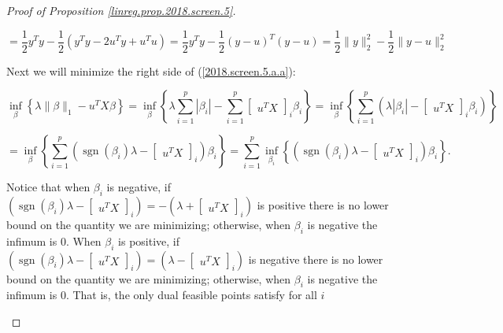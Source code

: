 \begin{proof}[Proof of Proposition \ref{linreg.prop.2018.screen.5}]
\begin{enumerate}[(a)]
\[
= \frac{1}{2} y^Ty - \frac{1}{2}(y^Ty - 2u^Ty + u^Tu ) = \frac{1}{2} y^Ty - \frac{1}{2}(y - u)^T(y - u)= \frac{1}{2} \lVert y \rVert_2^2 - \frac{1}{2} \lVert y - u \rVert_2^2 
\]

Next we will minimize the right side of (\ref{2018.screen.5.a.a}):

\[
 \inf_{\beta} \left\{ \lambda \lVert \beta \rVert_1  - u^T X \beta  \right\} =  \inf_{\beta} \left\{ \lambda \sum_{i=1}^p | \beta_i| - \sum_{i=1}^p \begin{bmatrix} u^T X \end{bmatrix}_i  \beta_i  \right\}  =  \inf_{\beta} \left\{ \sum_{i=1}^p  \left( \lambda  | \beta_i| -  \begin{bmatrix} u^T X \end{bmatrix}_i  \beta_i \right)  \right\} 
 \]
 
 
 \[
 =  \inf_{\beta} \left\{ \sum_{i=1}^p  \left(\operatorname{sgn}(\beta_i) \lambda-  \begin{bmatrix} u^T X \end{bmatrix}_i  \right)    \beta_i  \right\}   =  \sum_{i=1}^p  \inf_{\beta_i} \left\{ \left(\operatorname{sgn}(\beta_i) \lambda-  \begin{bmatrix} u^T X \end{bmatrix}_i  \right)    \beta_i  \right\} .
 \]
 
Notice that when \(\beta_i\) is negative, if \(\left(\operatorname{sgn}(\beta_i) \lambda-  \begin{bmatrix} u^T X \end{bmatrix}_i  \right) =  -\left(\lambda+  \begin{bmatrix} u^T X \end{bmatrix}_i  \right)\) is positive there is no lower bound on the quantity we are minimizing; otherwise, when \(\beta_i\) is negative the infimum is 0. When \(\beta_i\) is positive, if  \(\left(\operatorname{sgn}(\beta_i) \lambda-  \begin{bmatrix} u^T X \end{bmatrix}_i  \right) =  \left(\lambda-  \begin{bmatrix} u^T X \end{bmatrix}_i  \right)\) is negative there is no lower bound on the quantity we are minimizing; otherwise, when \(\beta_i\) is negative the infimum is 0. That is, the only dual feasible points satisfy for all \(i\)


\end{enumerate}
\end{proof}
